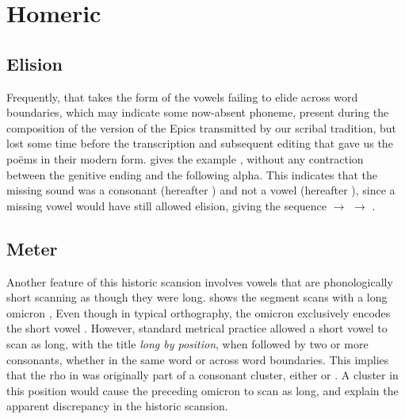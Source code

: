 \section{Homeric}\label{sec:Homeric}

\subsection{Elision}\label{subsec:Elision}
    Frequently, that takes the form
    of the vowels failing to elide across word boundaries, which may indicate some now-absent
    phoneme, present during the composition of the version of the Epics transmitted by our
    scribal tradition, but lost some time before the transcription and subsequent editing that gave
    us the po\"ems in their modern form.  gives the example
    ,\autocite[\MakeUppercase{}.214]{Iliad_1999} without any contraction between the genitive ending
     and the following alpha.
    This indicates that the missing sound was a consonant (hereafter \w) and not
    a vowel (hereafter \vowel), since a missing vowel would have still allowed elision,
    giving the sequence  $\to$ 
    $\to$ .

\subsection{Meter}\label{subsec:Meter}
    Another feature of this historic scansion involves vowels
    that are phonologically short scanning as though they were long.
     shows the segment  scans with a long omicron
    ,\autocite[\MakeUppercase{]}.306]{Iliad_1999}
    Even though in typical orthography, the omicron  exclusively encodes the short vowel .
    However, standard metrical practice allowed a short vowel to scan as long, with the title \textit{long by position},
    when followed by two or more consonants, whether in the same word or across word boundaries. This implies
    that the rho  in  was originally part of a consonant
    cluster, either  or . A cluster in this position would cause the
    preceding omicron  to scan as long, and explain the apparent discrepancy
    in the historic scansion.
    
